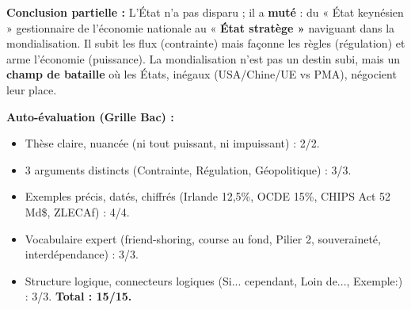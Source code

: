 \documentclass[11pt]{article}
\begin{document}
\begin{exoresolu}
    \textbf{Conclusion partielle :} L'État n'a pas disparu ; il a \textbf{muté} : du « État keynésien » gestionnaire de l'économie nationale au « \textbf{État stratège »} naviguant dans la mondialisation. Il subit les flux (contrainte) mais façonne les règles (régulation) et arme l'économie (puissance). La mondialisation n'est pas un destin subi, mais un \textbf{champ de bataille} où les États, inégaux (USA/Chine/UE vs PMA), négocient leur place.
    
    \textbf{Auto-évaluation (Grille Bac) :}
    \begin{itemize}
        \item Thèse claire, nuancée (ni tout puissant, ni impuissant) : 2/2.
        \item 3 arguments distincts (Contrainte, Régulation, Géopolitique) : 3/3.
        \item Exemples précis, datés, chiffrés (Irlande 12,5\%, OCDE 15\%, CHIPS Act 52 Md\$, ZLECAf) : 4/4.
        \item Vocabulaire expert (friend-shoring, course au fond, Pilier 2, souveraineté, interdépendance) : 3/3.
        \item Structure logique, connecteurs logiques (Si... cependant, Loin de..., Exemple:) : 3/3. \textbf{Total : 15/15.}
    \end{itemize}
\end{exoresolu}
\end{document}
